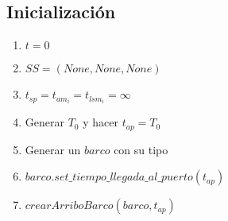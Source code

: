 \documentclass[a4paper,10pt]{article}
\begin{document}
\subsection*{Inicialización}
\begin{enumerate}
	\item $t = 0$
	\item $SS=(None,None,None)$
	\item $t_{sp} = t_{am_{i}} = t_{lsm_{i}} = \infty$
	\item Generar $T_0$ y hacer $t_{ap} = T_0$
	\item Generar un $barco$ con su tipo
	\item $barco.set\_tiempo\_llegada\_al\_puerto(t_{ap})$
	\item $crearArriboBarco(barco, t_{ap})$
\end{enumerate}
\end{document}
